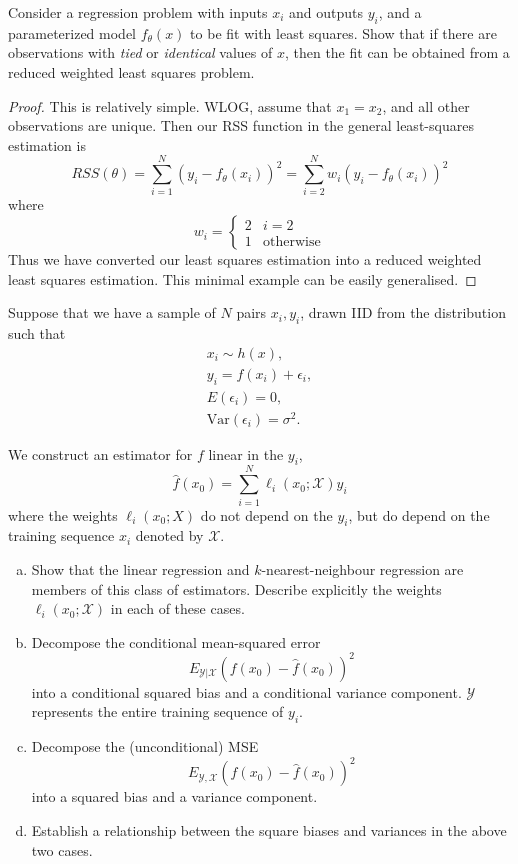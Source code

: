 \begin{exer}
    Consider a regression problem with inputs $x_i$ and outputs $y_i$, and a parameterized model $f_\theta(x)$ to be fit with least squares.  Show that if there are observations with \emph{tied} or \emph{identical} values of $x$, then the fit can be obtained from a reduced weighted least squares problem.
\end{exer}

\begin{proof}
    This is relatively simple.  WLOG, assume that $x_1 = x_2$, and all other observations are unique.  Then our RSS function in the general least-squares estimation is \[
        RSS(\theta) = \sum_{i=1}^N \left(y_i - f_\theta(x_i) \right)^2 = \sum_{i=2}^N w_i \left(y_i - f_\theta(x_i) \right)^2 
    \] where \[
        w_i = \begin{cases}
            2 & i = 2 \\
            1 & \text{otherwise}
        \end{cases}
    \]
    Thus we have converted our least squares estimation into a reduced weighted least squares estimation.  This minimal example can be easily generalised.
\end{proof}

\begin{exer}
    Suppose that we have a sample of $N$ pairs $x_i, y_i$, drawn IID from the distribution such that \begin{align*}
        x_i \sim h(x), \\
        y_i = f(x_i) + \epsilon_i, \\
        E(\epsilon_i) = 0, \\
        \text{Var}(\epsilon_i) = \sigma^2.
    \end{align*}
    
    We construct an estimator for $f$ linear in the $y_i$, \[
        \hat f(x_0) = \sum_{i=1}^N \ell_i(x_0; \mathcal X) y_i
    \] where the weights $\ell_i(x_0; X)$ do not depend on the $y_i$, but do depend on the training sequence $x_i$ denoted by $\mathcal X$.  
    \begin{enumerate}[(a)]
        \item Show that the linear regression and $k$-nearest-neighbour regression are members of this class of estimators.  Describe explicitly the weights $\ell_i(x_0; \mathcal X)$ in each of these cases.
        \item Decompose the conditional mean-squared error \[
            E_{\mathcal Y | \mathcal X} \left( f(x_0) - \hat f(x_0) \right)^2
        \] into a conditional squared bias and a conditional variance component.  $\mathcal Y$ represents the entire training sequence of $y_i$.
        \item Decompose the (unconditional) MSE \[
            E_{\mathcal Y, \mathcal X}\left(f(x_0) - \hat f(x_0) \right)^2
        \] into a squared bias and a variance component.
        \item Establish a relationship between the square biases and variances in the above two cases.
    \end{enumerate}
\end{exer}

